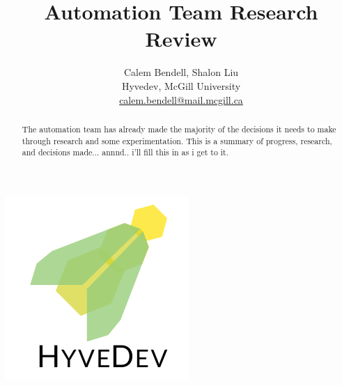

\title{Automation Team Research Review}
\author{
\normalsize
{ Calem Bendell, Shalon Liu} \\
Hyvedev, McGill University \\
\href{mailto:calem.bendell@mail.mcgill.ca}{calem.bendell@mail.mcgill.ca}
}
\date{}


\maketitle

\begin{abstract}
The automation team has already made the majority of the decisions it needs to make through research and some experimentation.
This is a summary of progress, research, and decisions made...
annnd.. i'll fill this in as i get to it.
\end{abstract}

\begin{center}
	\includegraphics[width=.3\textwidth]{gfx/hyvedev-logo.pdf}
\end{center}

